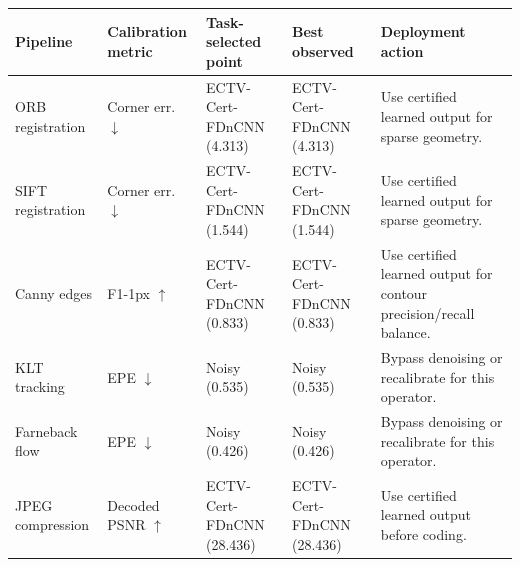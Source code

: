 \begin{tabular}{lp{}p{}p{}p{}}
\toprule
Pipeline & Calibration metric & Task-selected point & Best observed & Deployment action \\
\midrule
ORB registration & Corner err. $\downarrow$ & ECTV-Cert-FDnCNN (4.313) & ECTV-Cert-FDnCNN (4.313) & Use certified learned output for sparse geometry. \\
SIFT registration & Corner err. $\downarrow$ & ECTV-Cert-FDnCNN (1.544) & ECTV-Cert-FDnCNN (1.544) & Use certified learned output for sparse geometry. \\
Canny edges & F1-1px $\uparrow$ & ECTV-Cert-FDnCNN (0.833) & ECTV-Cert-FDnCNN (0.833) & Use certified learned output for contour precision/recall balance. \\
KLT tracking & EPE $\downarrow$ & Noisy (0.535) & Noisy (0.535) & Bypass denoising or recalibrate for this operator. \\
Farneback flow & EPE $\downarrow$ & Noisy (0.426) & Noisy (0.426) & Bypass denoising or recalibrate for this operator. \\
JPEG compression & Decoded PSNR $\uparrow$ & ECTV-Cert-FDnCNN (28.436) & ECTV-Cert-FDnCNN (28.436) & Use certified learned output before coding. \\
\bottomrule
\end{tabular}
